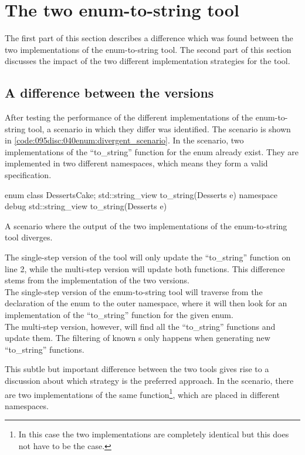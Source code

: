 \section{The two enum-to-string tool}

The first part of this section describes a difference which was found between the two implementations of the enum-to-string tool.
The second part of this section discusses the impact of the two different implementation strategies for the tool.

\subsection{A difference between the versions}
After testing the performance of the different implementations of the enum-to-string tool, a scenario in which they differ was identified. The scenario is shown in \cref{code:095disc:040enum:divergent_scenario}. In the scenario, two implementations of the ``to\_string'' function for the  enum already exist. They are implemented in two different namespaces, which means they form a valid specification.

\begin{listing}[H]
    \begin{cppcode}
enum class Desserts{Cake};
std::string_view to_string(Desserts e){}
namespace debug {
    std::string_view to_string(Desserts e){}
}
    \end{cppcode}
    \caption{A scenario where the output of the two implementations of the enum-to-string tool diverges.}
    \label{code:095disc:040enum:divergent_scenario}
  \end{listing}

The single-step version of the tool will only update the ``to\_string'' function on line 2, while the multi-step version will update both functions.
This difference stems from the implementation of the two versions.\\
The single-step version of the enum-to-string tool will traverse from the declaration of the enum to the outer namespace, where it will then look for an implementation of the ``to\_string'' function for the given enum.\\
The multi-step version, however, will find all the ``to\_string'' functions and update them. The filtering of known s only happens when generating new ``to\_string'' functions.

This subtle but important difference between the two tools gives rise to a discussion about which strategy is the preferred approach. In the scenario, there are two implementations of the same function\footnote{In this case the two implementations are completely identical but this does not have to be the case.}, which are placed in different namespaces. 

